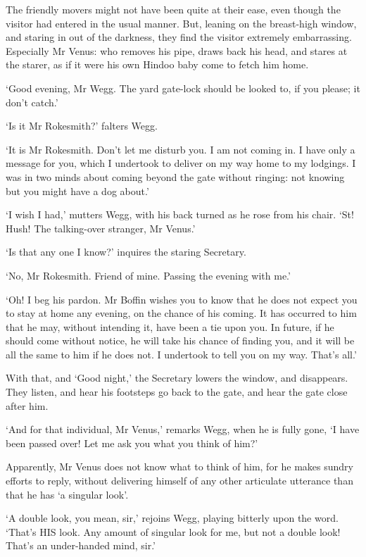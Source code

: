 The friendly movers might not have been quite at their ease, even
though the visitor had entered in the usual manner. But, leaning on the
breast-high window, and staring in out of the darkness, they find the
visitor extremely embarrassing. Especially Mr Venus: who removes his
pipe, draws back his head, and stares at the starer, as if it were his
own Hindoo baby come to fetch him home.

‘Good evening, Mr Wegg. The yard gate-lock should be looked to, if you
please; it don’t catch.’

‘Is it Mr Rokesmith?’ falters Wegg.

‘It is Mr Rokesmith. Don’t let me disturb you. I am not coming in. I
have only a message for you, which I undertook to deliver on my way home
to my lodgings. I was in two minds about coming beyond the gate without
ringing: not knowing but you might have a dog about.’

‘I wish I had,’ mutters Wegg, with his back turned as he rose from his
chair. ‘St! Hush! The talking-over stranger, Mr Venus.’

‘Is that any one I know?’ inquires the staring Secretary.

‘No, Mr Rokesmith. Friend of mine. Passing the evening with me.’

‘Oh! I beg his pardon. Mr Boffin wishes you to know that he does not
expect you to stay at home any evening, on the chance of his coming. It
has occurred to him that he may, without intending it, have been a tie
upon you. In future, if he should come without notice, he will take his
chance of finding you, and it will be all the same to him if he does
not. I undertook to tell you on my way. That’s all.’

With that, and ‘Good night,’ the Secretary lowers the window, and
disappears. They listen, and hear his footsteps go back to the gate, and
hear the gate close after him.

‘And for that individual, Mr Venus,’ remarks Wegg, when he is fully
gone, ‘I have been passed over! Let me ask you what you think of him?’

Apparently, Mr Venus does not know what to think of him, for he makes
sundry efforts to reply, without delivering himself of any other
articulate utterance than that he has ‘a singular look’.

‘A double look, you mean, sir,’ rejoins Wegg, playing bitterly upon the
word. ‘That’s HIS look. Any amount of singular look for me, but not a
double look! That’s an under-handed mind, sir.’

